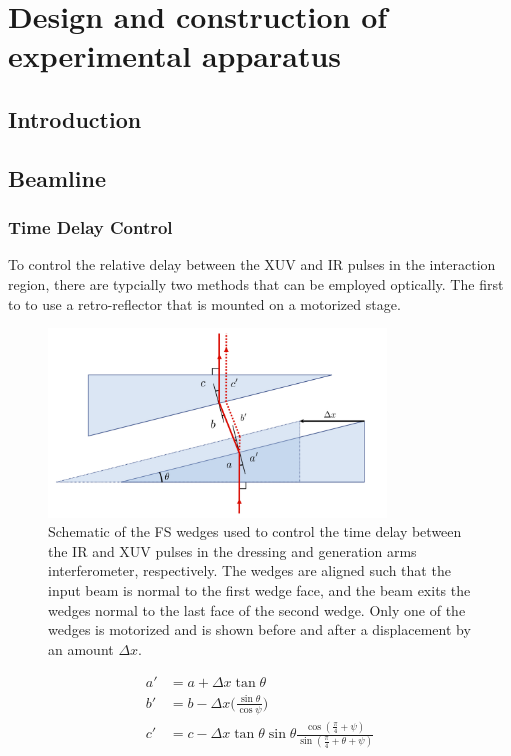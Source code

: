 \chapter{Design and construction of experimental apparatus}
\label{beamline}

\section{Introduction}
\label{intro_beamline}


\section{Beamline}
\label{sec:full_beamline}

\subsection{Time Delay Control}
\label{sec:delay_wedges}

To control the relative delay between the XUV and IR pulses in the interaction region, there are typcially two methods that can be employed optically.  The first to to use a retro-reflector that is mounted on a motorized stage.
\begin{figure}
	\centering
	\includegraphics[width=0.8\textwidth]{figures/Beamline/wedge_calibration.pdf}
	\caption{Schematic of the FS wedges used to control the time delay between the IR and XUV pulses in the dressing and generation arms interferometer, respectively. The wedges are aligned such that the input beam is normal to the first wedge face, and the beam exits the wedges normal to the last face of the second wedge.  Only one of the wedges is motorized and is shown before and after a displacement by an amount $\Delta x$.}
	\label{fig:wedges}
\end{figure}


\begin{align}
	a'&=a+\Delta x \tan\theta\\
	b'&=b-\Delta x \bigg(\frac{\sin\theta}{\cos\psi}\bigg)\\
	c'&=c-\Delta x \tan\theta\sin\theta\frac{\cos(\frac{\pi}{4}+\psi)}{\sin(\frac{\pi}{4}+\theta+\psi)}
\end{align}

